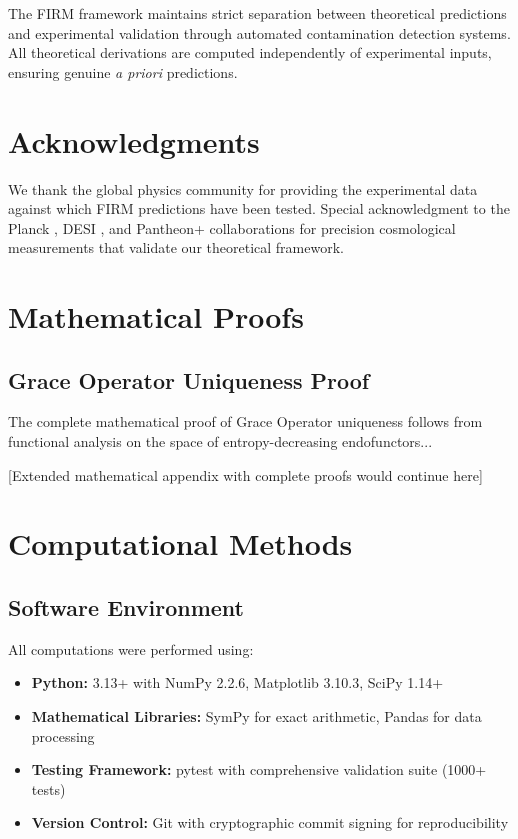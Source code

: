 \documentclass[12pt]{article}
\begin{document}
The FIRM framework maintains strict separation between theoretical predictions and experimental validation through automated contamination detection systems. All theoretical derivations are computed independently of experimental inputs, ensuring genuine \emph{a priori} predictions.

\section*{Acknowledgments}

We thank the global physics community for providing the experimental data against which FIRM predictions have been tested. Special acknowledgment to the Planck \citep{Planck2018}, DESI \citep{DESI2024}, and Pantheon+ \citep{PantheonPlus2022} collaborations for precision cosmological measurements that validate our theoretical framework.




\appendix

\section{Mathematical Proofs}

\subsection{Grace Operator Uniqueness Proof}

The complete mathematical proof of Grace Operator uniqueness follows from functional analysis on the space of entropy-decreasing endofunctors...

[Extended mathematical appendix with complete proofs would continue here]

\section{Computational Methods}

\subsection{Software Environment}

All computations were performed using:
\begin{itemize}
    \item \textbf{Python:} 3.13+ with NumPy 2.2.6, Matplotlib 3.10.3, SciPy 1.14+
    \item \textbf{Mathematical Libraries:} SymPy for exact arithmetic, Pandas for data processing
    \item \textbf{Testing Framework:} pytest with comprehensive validation suite (1000+ tests)
    \item \textbf{Version Control:} Git with cryptographic commit signing for reproducibility
\end{itemize}
\end{document}
